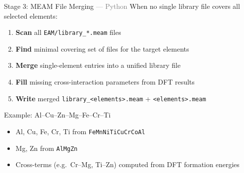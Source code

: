 \begin{frame}{Stage 3: MEAM File Merging \normalfont\small\textcolor{gray}{--- Python}}
When no single library file covers all selected elements:

\begin{enumerate}
  \item \textbf{Scan} all \texttt{EAM/library\_*.meam} files
  \item \textbf{Find} minimal covering set of files for the target elements
  \item \textbf{Merge} single-element entries into a unified library file
  \item \textbf{Fill} missing cross-interaction parameters from DFT results
  \item \textbf{Write} merged \texttt{library\_<elements>.meam} + \texttt{<elements>.meam}
\end{enumerate}

\vspace{0.5em}
\begin{block}{Example: Al--Cu--Zn--Mg--Fe--Cr--Ti}
\begin{itemize}
  \item Al, Cu, Fe, Cr, Ti from \texttt{FeMnNiTiCuCrCoAl}
  \item Mg, Zn from \texttt{AlMgZn}
  \item Cross-terms (e.g.\ Cr--Mg, Ti--Zn) computed from DFT formation energies
\end{itemize}
\end{block}
\end{frame}
